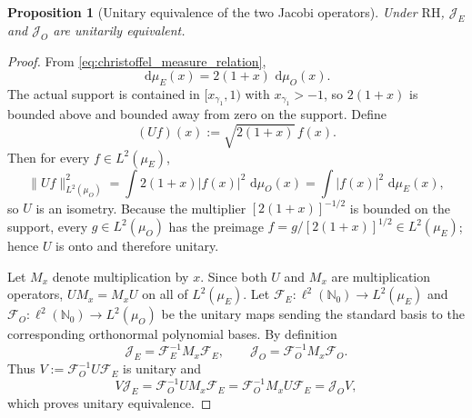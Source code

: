\documentclass[11pt]{amsart}
\numberwithin{equation}{section}
\theoremstyle{plain}
\newtheorem{proposition}[theorem]{Proposition}
\theoremstyle{definition}
\theoremstyle{remark}
\newcommand{\RH}{\mathrm{RH}}
\newcommand{\dd}{\,\mathrm d}
\begin{document}
\begin{proposition}[Unitary equivalence of the two Jacobi operators]
\label{prop:Jacobi_unitary_equivalence}
Under $\RH$, $\mathcal J_E$ and $\mathcal J_O$ are unitarily equivalent.
\end{proposition}

\begin{proof}
From \eqref{eq:christoffel_measure_relation},
\begin{equation}
\dd\mu_E(x)=2(1+x)\,\dd\mu_O(x).
\label{eq:measure_RN_repeat}
\end{equation}
The actual support is contained in $[x_{\gamma_1},1)$ with $x_{\gamma_1}>-1$, so $2(1+x)$ is bounded above and bounded away from zero on the support.  Define
\begin{equation}
(Uf)(x):=\sqrt{2(1+x)}\,f(x).
\label{eq:measure_unitary_map}
\end{equation}
Then for every $f\in L^2(\mu_E)$,
\begin{equation}
\|Uf\|_{L^2(\mu_O)}^2
=\int 2(1+x)|f(x)|^2\,\dd\mu_O(x)
=\int |f(x)|^2\,\dd\mu_E(x),
\end{equation}
so $U$ is an isometry.  Because the multiplier $[2(1+x)]^{-1/2}$ is bounded on the support, every $g\in L^2(\mu_O)$ has the preimage
$f=g/[2(1+x)]^{1/2}\in L^2(\mu_E)$; hence $U$ is onto and therefore unitary.

Let $M_x$ denote multiplication by $x$.  Since both $U$ and $M_x$ are multiplication operators,
$UM_x=M_xU$ on all of $L^2(\mu_E)$.  Let $\mathcal F_E:\ell^2(\mathbb N_0)\to L^2(\mu_E)$ and
$\mathcal F_O:\ell^2(\mathbb N_0)\to L^2(\mu_O)$ be the unitary maps sending the standard basis to the corresponding orthonormal polynomial bases.  By definition
\begin{equation}
\mathcal J_E=\mathcal F_E^{-1}M_x\mathcal F_E,
\qquad
\mathcal J_O=\mathcal F_O^{-1}M_x\mathcal F_O.
\end{equation}
Thus $V:=\mathcal F_O^{-1}U\mathcal F_E$ is unitary and
\begin{equation}
V\mathcal J_E
=\mathcal F_O^{-1}UM_x\mathcal F_E
=\mathcal F_O^{-1}M_xU\mathcal F_E
=\mathcal J_OV,
\end{equation}
which proves unitary equivalence.
\end{proof}
\end{document}
